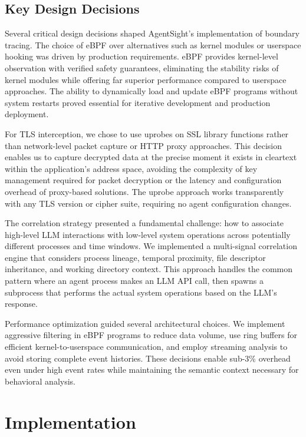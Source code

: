 \subsection{Key Design Decisions}

Several critical design decisions shaped AgentSight's implementation of boundary tracing. The choice of eBPF over alternatives such as kernel modules or userspace hooking was driven by production requirements. eBPF provides kernel-level observation with verified safety guarantees, eliminating the stability risks of kernel modules while offering far superior performance compared to userspace approaches. The ability to dynamically load and update eBPF programs without system restarts proved essential for iterative development and production deployment.

For TLS interception, we chose to use uprobes on SSL library functions rather than network-level packet capture or HTTP proxy approaches. This decision enables us to capture decrypted data at the precise moment it exists in cleartext within the application's address space, avoiding the complexity of key management required for packet decryption or the latency and configuration overhead of proxy-based solutions. The uprobe approach works transparently with any TLS version or cipher suite, requiring no agent configuration changes.

The correlation strategy presented a fundamental challenge: how to associate high-level LLM interactions with low-level system operations across potentially different processes and time windows. We implemented a multi-signal correlation engine that considers process lineage, temporal proximity, file descriptor inheritance, and working directory context. This approach handles the common pattern where an agent process makes an LLM API call, then spawns a subprocess that performs the actual system operations based on the LLM's response.

Performance optimization guided several architectural choices. We implement aggressive filtering in eBPF programs to reduce data volume, use ring buffers for efficient kernel-to-userspace communication, and employ streaming analysis to avoid storing complete event histories. These decisions enable sub-3\% overhead even under high event rates while maintaining the semantic context necessary for behavioral analysis.


\section{Implementation}

